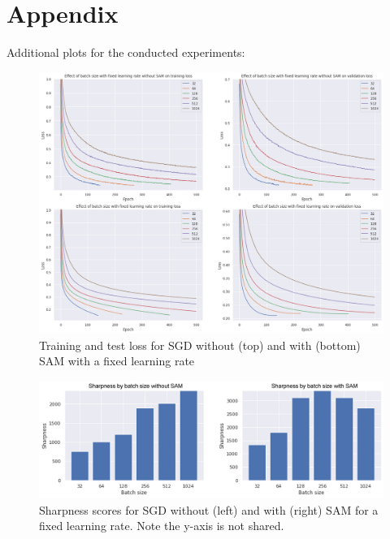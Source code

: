 \documentclass[10pt,conference,compsocconf]{IEEEtran}
\begin{document}
\newpage



\newpage
\section*{Appendix}
\label{sec:appendix}
Additional plots for the conducted experiments:
\begin{figure}[H]
  \centering
  \includegraphics[width=\columnwidth]{img/figure6_val_loss_with_without_sam_sgd_FIXED_LR}
  \caption{Training and test loss for SGD without (top) and with (bottom) SAM with a fixed learning rate}
  \vspace{-3mm}
  \label{fig:adam-val-loss-with-without-fixed}
\end{figure}
\begin{figure}[H]
  \centering
  \includegraphics[width=\columnwidth]{img/figure7_sharpness_with_without_sam_sgd_FIXED_LR}
  \caption{Sharpness scores for SGD without (left) and with (right) SAM for a fixed learning rate. Note the y-axis is not shared.}
  \vspace{-3mm}
  \label{fig:adam-sharpness-with-without-fixed}
\end{figure}
\end{document}
